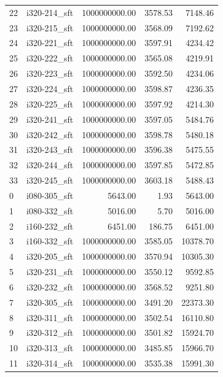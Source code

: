\begin{tabular}{llrrr}
22 &  i320-214\_sft & 1000000000.00 &           3578.53 &     7148.46 \\
23 &  i320-215\_sft & 1000000000.00 &           3568.09 &     7192.62 \\
24 &  i320-221\_sft & 1000000000.00 &           3597.91 &     4234.42 \\
25 &  i320-222\_sft & 1000000000.00 &           3565.08 &     4219.91 \\
26 &  i320-223\_sft & 1000000000.00 &           3592.50 &     4234.06 \\
27 &  i320-224\_sft & 1000000000.00 &           3598.87 &     4236.35 \\
28 &  i320-225\_sft & 1000000000.00 &           3597.92 &     4214.30 \\
29 &  i320-241\_sft & 1000000000.00 &           3597.05 &     5484.76 \\
30 &  i320-242\_sft & 1000000000.00 &           3598.78 &     5480.18 \\
31 &  i320-243\_sft & 1000000000.00 &           3596.38 &     5475.55 \\
32 &  i320-244\_sft & 1000000000.00 &           3597.85 &     5472.85 \\
33 &  i320-245\_sft & 1000000000.00 &           3603.18 &     5488.43 \\
0  &  i080-305\_sft &       5643.00 &              1.93 &     5643.00 \\
1  &  i080-332\_sft &       5016.00 &              5.70 &     5016.00 \\
2  &  i160-232\_sft &       6451.00 &            186.75 &     6451.00 \\
3  &  i160-332\_sft & 1000000000.00 &           3585.05 &    10378.70 \\
4  &  i320-205\_sft & 1000000000.00 &           3570.94 &    10305.30 \\
5  &  i320-231\_sft & 1000000000.00 &           3550.12 &     9592.85 \\
6  &  i320-232\_sft & 1000000000.00 &           3568.52 &     9251.80 \\
7  &  i320-305\_sft & 1000000000.00 &           3491.20 &    22373.30 \\
8  &  i320-311\_sft & 1000000000.00 &           3502.54 &    16110.80 \\
9  &  i320-312\_sft & 1000000000.00 &           3501.82 &    15924.70 \\
10 &  i320-313\_sft & 1000000000.00 &           3485.85 &    15966.70 \\
11 &  i320-314\_sft & 1000000000.00 &           3535.38 &    15991.30 \\

\end{tabular}
